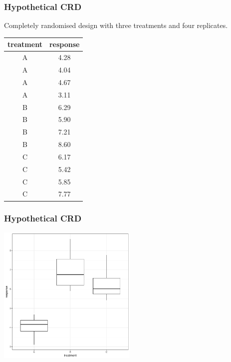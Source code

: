 \begin{frame}\frametitle{Hypothetical CRD}
Completely randomised design with three treatments and four replicates.

\begin{table}[ht]
\centering
\begin{tabular}{cc}
 \toprule
  treatment & response \\
  \midrule
  A & 4.28 \\
  A & 4.04 \\
  A & 4.67 \\
  A & 3.11 \\
  B & 6.29 \\
  B & 5.90 \\
  B & 7.21 \\
  B & 8.60 \\
  C & 6.17 \\
   C & 5.42 \\
   C & 5.85 \\
   C & 7.77 \\
   \bottomrule
\end{tabular}
\end{table}

\end{frame}



\begin{frame}\frametitle{Hypothetical CRD}
\centering
\includegraphics[width=0.5\textwidth]{hypcrd_boxplot.pdf}
\end{frame}

